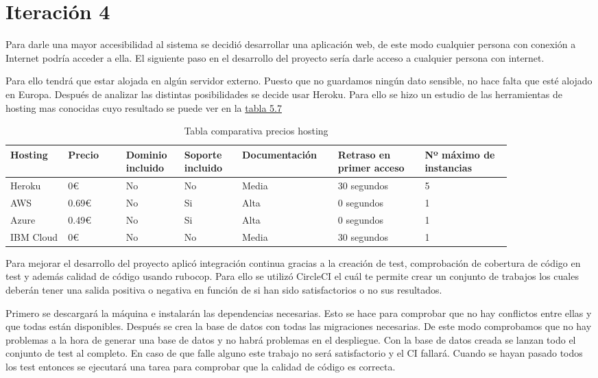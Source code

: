 \section{Iteración 4}

Para darle una mayor accesibilidad al sistema se decidió desarrollar
una aplicación web, de este modo cualquier persona con conexión a
Internet podría acceder a ella. El siguiente paso en el desarrollo
del proyecto sería darle acceso a cualquier persona con internet.

Para ello tendrá que estar alojada en algún servidor externo.
Puesto que no guardamos ningún dato sensible, no hace falta
que esté alojado en Europa. Después de analizar las distintas posibilidades
se decide usar Heroku. Para ello se hizo un estudio de las herramientas
de hosting mas conocidas cuyo resultado se puede ver en la \hyperref[tab:Tabla comparativa precios hosting]{tabla 5.7}

\begin{longtable}{|p{0.1\linewidth}p{0.1\linewidth}p{0.1\linewidth}p{0.1\linewidth}p{0.15\linewidth}p{0.15\linewidth}p{0.15\linewidth}|}
  \caption{Tabla comparativa precios hosting}
  \label{tab:Tabla comparativa precios hosting}
  \endfirsthead
  \endhead
  \hline
  \multicolumn{1}{|l}{Hosting} & Precio & Dominio incluido & Soporte incluido & Documentación & Retraso en primer acceso & Nº máximo de instancias \\ \hline
  Heroku & 0€ & No & No & Media & 30 segundos & 5 \\ \hline
  AWS & 0.69€ & No & Si & Alta & 0 segundos & 1 \\ \hline
  Azure & 0.49€ & No & Si & Alta & 0 segundos & 1 \\ \hline
  IBM Cloud & 0€ & No & No & Media & 30 segundos & 1 \\ \hline
\end{longtable}

Para mejorar el desarrollo del proyecto aplicó integración continua gracias
a la creación de test, comprobación de cobertura de código en test y además
calidad de código usando rubocop. Para ello se utilizó CircleCI el cuál te
permite crear un conjunto de trabajos los cuales deberán tener una salida
positiva o negativa en función de si han sido satisfactorios o no sus resultados.

Primero se descargará la máquina e instalarán las dependencias necesarias.
Esto se hace para comprobar que no hay conflictos entre ellas y que todas
están disponibles. Después se crea la base de datos con todas las migraciones
necesarias. De este modo comprobamos que no hay problemas a la hora
de generar una base de datos y no habrá problemas en el despliegue.
Con la base de datos creada se lanzan todo el conjunto de test al completo.
En caso de que falle alguno este trabajo no será satisfactorio y el CI
fallará. Cuando se hayan pasado todos los test entonces se ejecutará
una tarea para comprobar que la calidad de código es correcta.

